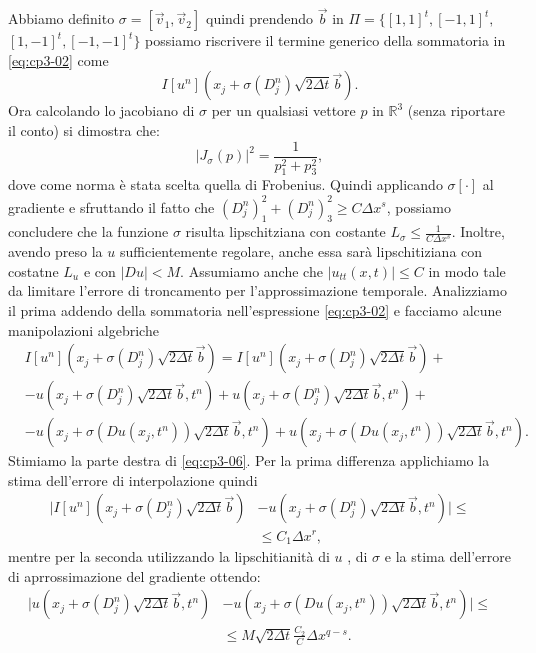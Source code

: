 Abbiamo definito $\sigma=[\vec{v}_1,\vec{v}_2]$ quindi prendendo $\vec{b}$ in $\Pi=\{[1,1]^t,[-1,1]^t,$ $[1,-1]^t,[-1,-1]^t\}$ possiamo riscrivere il termine generico della sommatoria in \eqref{eq:cp3-02} come
\[
I[u^n](x_j+\sigma(D_j^n)\sqrt{2\Delta t}\vec{b}).
\]
Ora calcolando lo jacobiano di $\sigma$ per un qualsiasi vettore $p$ in $\mathbb{R}^3$ (senza riportare il conto) si dimostra che:
\[
\left|J_{\sigma}(p)\right|^2=\frac{1}{p_1^2+p_3^2},
\]
dove come norma è stata scelta quella di Frobenius. Quindi applicando $\sigma[\cdot]$ al gradiente e sfruttando il fatto che $(D_j^n)_1^2+(D_j^n)_3^2\ge C\Delta x^s$, possiamo concludere che la funzione $\sigma$ risulta lipschitziana con costante $L_{\sigma}\le\frac{1}{C\Delta x^s}$.
Inoltre, avendo preso la $u$ sufficientemente regolare, anche essa sarà lipschitiziana con costatne $L_u$ e con $|Du|< M$. Assumiamo anche che $|u_{tt}(x,t)|\le C$ in modo tale da limitare l'errore di troncamento per l'approssimazione temporale.
 Analizziamo il prima addendo della sommatoria nell'espressione \eqref{eq:cp3-02} e facciamo alcune manipolazioni algebriche
\begin{equation}
\label{eq:cp3-06}
\begin{split}
& I[u^n](x_j+\sigma(D_j^n)\sqrt{2\Delta t}\vec{b}) = I[u^n](x_j+\sigma(D_j^n)\sqrt{2\Delta t}\vec{b}) + \\
& -u(x_j+\sigma(D_j^n)\sqrt{2\Delta t}\vec{b},t^n) + u(x_j+\sigma(D_j^n)\sqrt{2\Delta t}\vec{b},t^n)+ \\
& - u(x_j+\sigma(Du(x_j,t^n))\sqrt{2\Delta t}\vec{b},t^n)+ u(x_j+\sigma(Du(x_j,t^n))\sqrt{2\Delta t}\vec{b},t^n).
\end{split}
\end{equation}
Stimiamo la parte destra di \eqref{eq:cp3-06}. Per la prima differenza applichiamo la stima dell'errore di interpolazione quindi
\begin{equation}
  \label{eq:cp3-07}
  \begin{split}
    |I[u^n](x_j+\sigma(D_j^n)\sqrt{2\Delta t}\vec{b}) &- u(x_j+\sigma(D_j^n)\sqrt{2\Delta t}\vec{b},t^n)|\le \\
    & \le C_1\Delta x^r,
\end{split}
\end{equation}
mentre per la seconda utilizzando la lipschitianità di $u$ , di $\sigma$ e la stima dell'errore di aprrossimazione del gradiente ottendo:
\begin{equation}
  \label{eq:cp3-08}
  \begin{split}
    |u(x_j+\sigma(D_j^n)\sqrt{2\Delta t}\vec{b},t^n) &- u(x_j+\sigma(Du(x_j,t^n))\sqrt{2\Delta t}\vec{b},t^n)|\le \\
    & \le M\sqrt{2\Delta t}\frac{C_2}{C}\Delta x^{q-s}.
  \end{split}
\end{equation}
